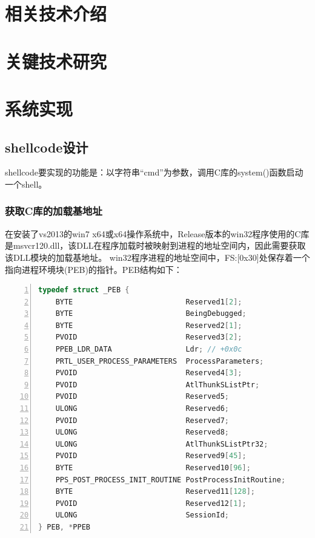 \documentclass[bachelor]{thesis-uestc}
\begin{document}
\thesistableofcontents

\thesischapterexordium %

\chapter{相关技术介绍}

\chapter{关键技术研究}

\chapter{系统实现}
\section{shellcode设计}
shellcode要实现的功能是：以字符串``cmd''为参数，调用C库的system()函数启动一个shell。

\subsection{获取C库的加载基地址}
在安装了vs2013的win7 x64或x64操作系统中，Release版本的win32程序使用的C库是msvcr120.dll，该DLL在程序加载时被映射到进程的地址空间内，因此需要获取该DLL模块的加载基地址。
win32程序进程的地址空间中，FS:[0x30]处保存着一个指向进程环境块(PEB)的指针。PEB结构如下：

\begin{lstlisting}[language=C++, basicstyle=\ttfamily\tiny, numbers=left, numberstyle=\tiny, keywordstyle=\color{blue!70}, commentstyle=\color{red!50!green!50!blue!50}, frame=shadowbox, rulesepcolor=\color{red!20!green!20!blue!20}]
typedef struct _PEB {
	BYTE                          Reserved1[2];
	BYTE                          BeingDebugged;
	BYTE                          Reserved2[1];
	PVOID                         Reserved3[2];
	PPEB_LDR_DATA                 Ldr; // +0x0c 
	PRTL_USER_PROCESS_PARAMETERS  ProcessParameters;
	PVOID                         Reserved4[3];
	PVOID                         AtlThunkSListPtr;
	PVOID                         Reserved5;
	ULONG                         Reserved6;
	PVOID                         Reserved7;
	ULONG                         Reserved8;
	ULONG                         AtlThunkSListPtr32;
	PVOID                         Reserved9[45];
	BYTE                          Reserved10[96];
	PPS_POST_PROCESS_INIT_ROUTINE PostProcessInitRoutine;
	BYTE                          Reserved11[128];
	PVOID                         Reserved12[1];
	ULONG                         SessionId;
} PEB, *PPEB
\end{lstlisting}
\end{document}
